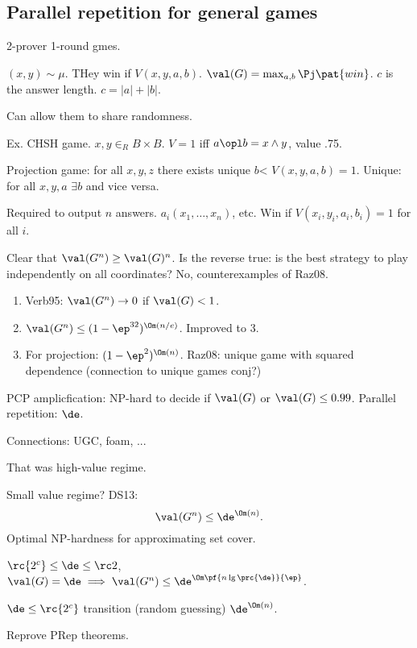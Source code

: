 \subsection{Parallel repetition for general games}

2-prover 1-round gmes. 


$(x,y)\sim \mu$.
THey win if $V(x,y,a,b)$. 
$\val(G)=\max_{a,b}\Pj\pat{win}$.
$c$ is the answer length. $c=|a|+|b|$.

Can allow them to share randomness.

Ex. CHSH game. $x,y\in_RB\times B$. 
$V=1$ iff $a\opl b=x\wedge y$, value .75.

Projection game: for all $x,y,z$ there exists unique $b$< $V(x,y,a,b)=1$. Unique: for all $x,y,a$ $\exists b$ and vice versa.

Required to output $n$ answers. $a_i(x_1,\ldots, x_n)$, etc.
Win if $V(x_i,y_i,a_i,b_i)=1$ for all $i$.

Clear that $\val(G^n)\ge \val(G)^n$. Is the reverse true: is the best strategy to play independently on all coordinates? No, counterexamples of Raz08.

\begin{enumerate}
\item
Verb95: $\val(G^n)\to 0$ if $\val(G)<1$. 
\item
$\val(G^n) \le (1-\ep^{32})^{\Om(n/e)}$.
Improved to 3. 
\item
For projection: $(1-\ep^2)^{\Om(n)}$. 
Raz08: unique game with squared dependence (connection to unique games conj?)
\end{enumerate}
PCP amplicfication: NP-hard to decide if $\val(G)$ or $\val(G)\le 0.99$. Parallel repetition: $\de$.

Connections: UGC, foam, ...

That was high-value regime.

Small value regime? DS13: 
\[
\val(G^n)\le \de^{\Om(n)}.
\]
Optimal NP-hardness for approximating set cover. 

\begin{thm}
$\rc{2^c}\le \de \le \rc2$, 
$\val(G)=\de\implies \val(G^n)\le\de^{\Om\pf{n\lg\prc{\de}}{\ep}}$.

$\de\le \rc{2^c}$ transition (random guessing) $\de^{\Om(n)}$. 
\end{thm}

Reprove PRep theorems.

